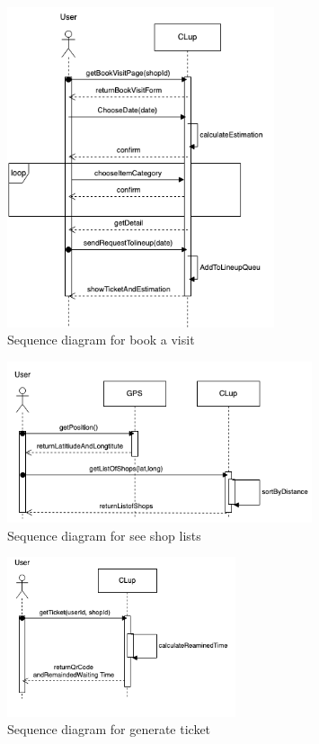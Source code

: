 \begin{figure}[H]
  \centering
  \includegraphics[width=0.7\textwidth,keepaspectratio]{images/BookAVisit_sd.png}
  \caption{Sequence diagram for book a visit}
\end{figure}

\begin{figure}[H]
  \centering
  \includegraphics[width=0.8\textwidth,keepaspectratio]{images/SeeShopList_sd.png}
  \caption{Sequence diagram for see shop lists}
\end{figure}

\begin{figure}[H]
  \centering
  \includegraphics[width=0.6\textwidth,keepaspectratio]{images/GetTicket_sd.png}
  \caption{Sequence diagram for generate ticket}
\end{figure}

